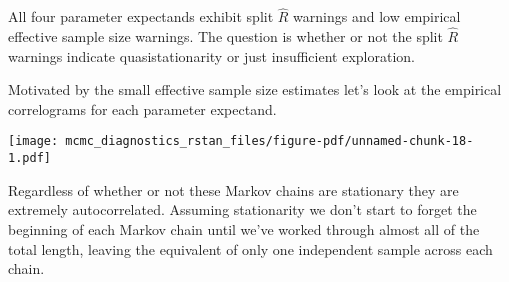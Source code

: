 \documentclass[
  letterpaper,
  DIV=11,
  numbers=noendperiod]{scrartcl}
\newenvironment{Shaded}{\begin{snugshade}}{\end{snugshade}}
\newcommand{\AttributeTok}[1]{\textcolor[rgb]{0.40,0.45,0.13}{#1}}
\newcommand{\DecValTok}[1]{\textcolor[rgb]{0.68,0.00,0.00}{#1}}
\newcommand{\FloatTok}[1]{\textcolor[rgb]{0.68,0.00,0.00}{#1}}
\newcommand{\FunctionTok}[1]{\textcolor[rgb]{0.28,0.35,0.67}{#1}}
\newcommand{\NormalTok}[1]{\textcolor[rgb]{0.00,0.23,0.31}{#1}}
\newcommand{\SpecialCharTok}[1]{\textcolor[rgb]{0.37,0.37,0.37}{#1}}
\newcommand{\StringTok}[1]{\textcolor[rgb]{0.13,0.47,0.30}{#1}}
\begin{document}
All four parameter expectands exhibit split \(\hat{R}\) warnings and low
empirical effective sample size warnings. The question is whether or not
the split \(\hat{R}\) warnings indicate quasistationarity or just
insufficient exploration.

Motivated by the small effective sample size estimates let's look at the
empirical correlograms for each parameter expectand.

\begin{Shaded}
\end{Shaded}

\texttt{[image: mcmc\_diagnostics\_rstan\_files/figure-pdf/unnamed-chunk-18-1.pdf]}

Regardless of whether or not these Markov chains are stationary they are
extremely autocorrelated. Assuming stationarity we don't start to forget
the beginning of each Markov chain until we've worked through almost all
of the total length, leaving the equivalent of only one independent
sample across each chain.
\end{document}

